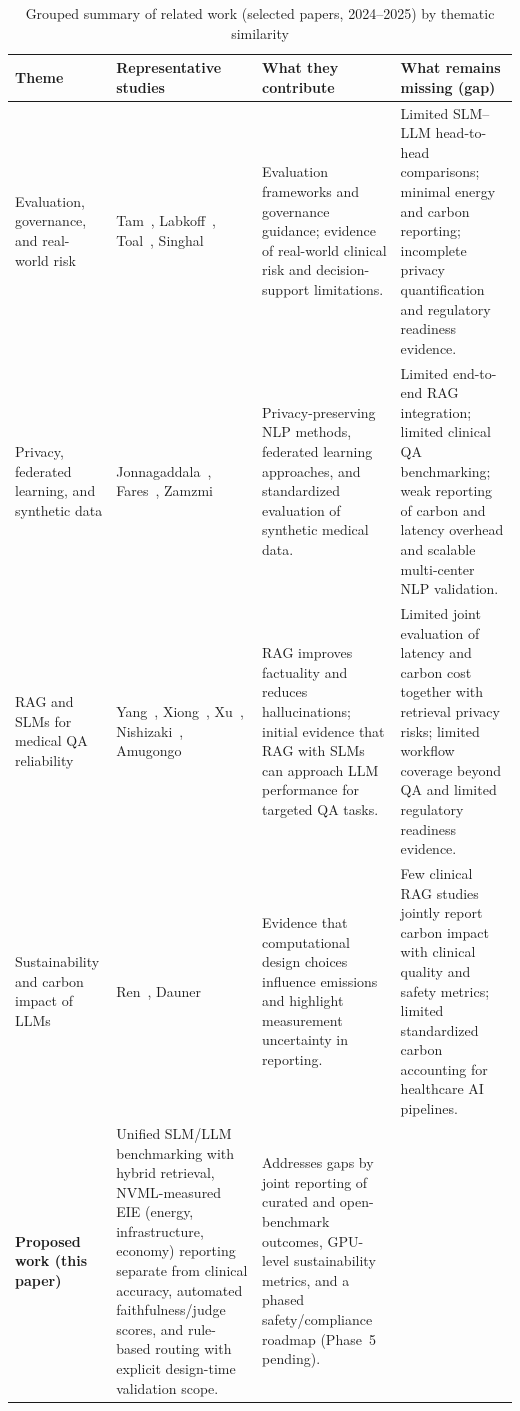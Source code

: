 \begin{table}[t]
\centering
\caption{Grouped summary of related work (selected papers, 2024--2025) by thematic similarity}
\label{tab:literature}
\scriptsize
\setlength{\tabcolsep}{2pt}
\renewcommand{\arraystretch}{0.95}
\begin{tabularx}{\textwidth}{p{2.7cm}p{3.1cm}XX}
\toprule
\textbf{Theme} & \textbf{Representative studies} & \textbf{What they contribute} & \textbf{What remains missing (gap)} \\
\midrule
Evaluation, governance, and real-world risk & Tam~\cite{tam2024quest}, Labkoff~\cite{labkoff2024aicds}, Toal~\cite{toal2025llm}, Singhal~\cite{singhal2025toward} &
Evaluation frameworks and governance guidance; evidence of real-world clinical risk and decision-support limitations. &
Limited SLM--LLM head-to-head comparisons; minimal energy and carbon reporting; incomplete privacy quantification and regulatory readiness evidence. \\
\midrule
Privacy, federated learning, and synthetic data & Jonnagaddala~\cite{jonnagaddala2025privacy}, Fares~\cite{fares2024federated}, Zamzmi~\cite{zamzmi2025smd} &
Privacy-preserving NLP methods, federated learning approaches, and standardized evaluation of synthetic medical data. &
Limited end-to-end RAG integration; limited clinical QA benchmarking; weak reporting of carbon and latency overhead and scalable multi-center NLP validation. \\
\midrule
RAG and SLMs for medical QA reliability & Yang~\cite{yang2025rag}, Xiong~\cite{xiong2024rag}, Xu~\cite{xu2025mega}, Nishizaki~\cite{nishizaki2025reducing}, Amugongo~\cite{amugongo2025retrieval} &
RAG improves factuality and reduces hallucinations; initial evidence that RAG with SLMs can approach LLM performance for targeted QA tasks. &
Limited joint evaluation of latency and carbon cost together with retrieval privacy risks; limited workflow coverage beyond QA and limited regulatory readiness evidence. \\
\midrule
Sustainability and carbon impact of LLMs & Ren~\cite{ren2024reconciling}, Dauner~\cite{dauner2025ai} &
Evidence that computational design choices influence emissions and highlight measurement uncertainty in reporting. &
Few clinical RAG studies jointly report carbon impact with clinical quality and safety metrics; limited standardized carbon accounting for healthcare AI pipelines. \\
\midrule
\textbf{Proposed work (this paper)} &
Unified SLM/LLM benchmarking with hybrid retrieval, NVML-measured EIE (energy, infrastructure, economy) reporting separate from clinical accuracy, automated faithfulness/judge scores, and rule-based routing with explicit design-time validation scope. &
Addresses gaps by joint reporting of curated and open-benchmark outcomes, GPU-level sustainability metrics, and a phased safety/compliance roadmap (Phase~5 pending). \\
\bottomrule
\end{tabularx}
\end{table}